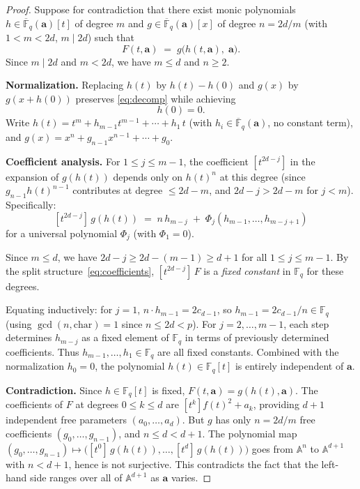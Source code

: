 \documentclass[11pt, a4paper]{article}
\theoremstyle{definition}
\theoremstyle{remark}
\newcommand{\Fq}{\mathbb{F}_q}
\newcommand{\Fqbar}{\overline{\mathbb{F}}_q}
\newcommand{\Affine}{\mathbb{A}}
\begin{document}
\begin{proof}
Suppose for contradiction that there exist monic polynomials
$h \in \Fqbar(\mathbf{a})[t]$ of degree $m$ and
$g \in \Fqbar(\mathbf{a})[x]$ of degree $n = 2d/m$
(with $1 < m < 2d$, $m \mid 2d$) such that
\begin{equation}\label{eq:decomp}
    F(t,\mathbf{a})
    \;=\; g\bigl(h(t,\mathbf{a}),\;\mathbf{a}\bigr).
\end{equation}
Since $m \mid 2d$ and $m < 2d$, we have $m \le d$ and $n \ge 2$.

\textbf{Normalization.}
Replacing $h(t)$ by $h(t) - h(0)$ and $g(x)$ by $g(x + h(0))$
preserves \eqref{eq:decomp} while achieving
\begin{equation}\label{eq:normalize}
    h(0) = 0.
\end{equation}
Write $h(t) = t^m + h_{m-1}t^{m-1} + \cdots + h_1\, t$
(with $h_i \in \Fqbar(\mathbf{a})$, no constant term), and
$g(x) = x^n + g_{n-1}x^{n-1} + \cdots + g_0$.

\textbf{Coefficient analysis.}
For $1 \le j \le m-1$, the coefficient $[t^{2d-j}]$ in the
expansion of $g(h(t))$ depends only on $h(t)^n$ at this degree
(since $g_{n-1} h(t)^{n-1}$ contributes at degree $\le 2d - m$,
and $2d - j > 2d - m$ for $j < m$).
Specifically:
\[
    [t^{2d-j}]\, g(h(t))
    \;=\; n\, h_{m-j}
    \;+\; \Phi_j(h_{m-1}, \ldots, h_{m-j+1})
\]
for a universal polynomial $\Phi_j$ (with $\Phi_1 = 0$).

Since $m \le d$, we have $2d - j \ge 2d - (m-1) \ge d + 1$
for all $1 \le j \le m - 1$.
By the split structure~\eqref{eq:coefficients},
$[t^{2d-j}]\, F$ is a \emph{fixed constant} in $\Fq$
for these degrees.

Equating inductively: for $j = 1$,
$n \cdot h_{m-1} = 2c_{d-1}$,
so $h_{m-1} = 2c_{d-1}/n \in \Fq$ (using
$\gcd(n, \mathrm{char}) = 1$ since $n \le 2d < p$).
For $j = 2, \ldots, m-1$, each step determines $h_{m-j}$
as a fixed element of $\Fq$ in terms of previously determined
coefficients.
Thus $h_{m-1}, \ldots, h_1 \in \Fq$ are all fixed constants.
Combined with the normalization $h_0 = 0$,
the polynomial $h(t) \in \Fq[t]$ is entirely independent of
$\mathbf{a}$.

\textbf{Contradiction.}
Since $h \in \Fq[t]$ is fixed, $F(t,\mathbf{a}) = g(h(t),\mathbf{a})$.
The coefficients of $F$ at degrees $0 \le k \le d$ are
$[t^k] f(t)^2 + a_k$, providing $d + 1$ independent free
parameters $(a_0, \ldots, a_d)$.
But $g$ has only $n = 2d/m$ free coefficients
$(g_0, \ldots, g_{n-1})$, and $n \le d < d + 1$.
The polynomial map
$(g_0, \ldots, g_{n-1})
\mapsto \bigl([t^0]\, g(h(t)), \ldots, [t^d]\, g(h(t))\bigr)$
goes from $\Affine^n$ to $\Affine^{d+1}$ with $n < d+1$,
hence is not surjective.
This contradicts the fact that the left-hand side ranges over
all of $\Affine^{d+1}$ as $\mathbf{a}$ varies.
\end{proof}
\end{document}

